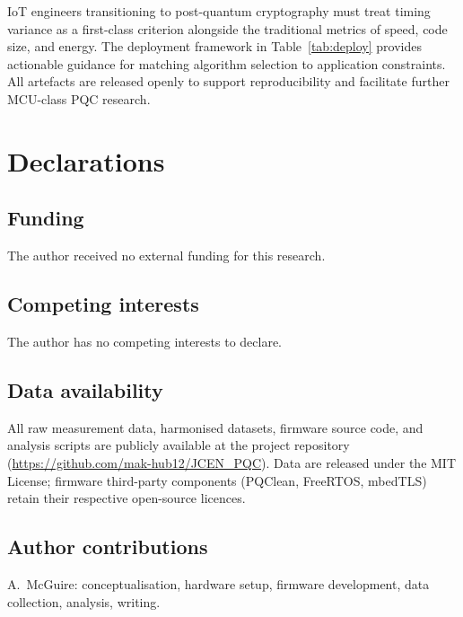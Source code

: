 \documentclass[iicol]{sn-jnl}
\begin{document}
IoT engineers transitioning to post-quantum cryptography must treat timing
variance as a first-class criterion alongside the traditional metrics of
speed, code size, and energy.
The deployment framework in Table~\ref{tab:deploy} provides actionable
guidance for matching algorithm selection to application constraints.
All artefacts are released openly to support reproducibility and
facilitate further MCU-class PQC research.

\section*{Declarations}

\subsection*{Funding}
The author received no external funding for this research.

\subsection*{Competing interests}
The author has no competing interests to declare.

\subsection*{Data availability}
All raw measurement data, harmonised datasets, firmware source code,
and analysis scripts are publicly available at the project
repository~\cite{jcen-repo} (\url{https://github.com/mak-hub12/JCEN_PQC}).
Data are released under the MIT License; firmware third-party components
(PQClean, FreeRTOS, mbedTLS) retain their respective open-source licences.

\subsection*{Author contributions}
A.\ McGuire: conceptualisation, hardware setup, firmware development,
data collection, analysis, writing.




\end{document}
